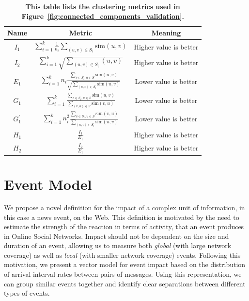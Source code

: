 \documentclass[10pt,letterpaper]{article}
\begin{document}
\begin{table}
  \centering
  \begin{tabular}{ c  c  c }
    \toprule
    Name & Metric & Meaning \\
    \midrule
    $I_1$ & $\sum_{i=1}^k \frac{1}{n_i} \sum_{(u,v) \in S_i} \text{sim}(u,v)$ & Higher value is better\\
    \midrule
    $I_2$ & $\sum_{i=1}^k \sqrt{ \sum_{(u,v) \in S_i} (u,v)}$ & Higher value is better \\
    \midrule
    $E_1$ & $\sum_{i=1}^{k} n_i \frac{\sum_{v \in S_i, u \in S} \text{sim}(u,v)}{\sqrt{\sum_{(u,v) \in S_i} \text{sim}(u,v)}}$ & Lower value is better \\
    \midrule
    $G_1$ & $\sum_{i=1}^k \frac{\sum_{v \in S_i, u \in S}\text{sim}(u,v)}{\sum_{(v,u) \in S}\text{sim}(v,u)}$ & Lower value is better \\
    \midrule
    $G_1^{'}$ & $\sum_{i=1}^k n_i^2 \frac{\sum_{v \in S_i, u \in S}\text{sim}(v,u)}{\sum_{(u,v) \in S_i}\text{sim}(u,v)}$ & Lower value is better \\
    \midrule
    $H_1$ & $\frac{I_1}{E_1}$ & Higher value is better \\
    \midrule
    $H_2$ & $\frac{I_2}{E_1}$ & Higher value is better \\
    \bottomrule
  \end{tabular}
  \caption{\textbf{This table lists the clustering metrics used in Figure~\ref{fig:connected_components_validation}.}}
  \label{table:clustering_metrics}
\end{table}


\section{Event Model}
We propose a novel definition for the impact of a complex unit of
information, in this case a news event, on the Web. This definition is
motivated by the need to estimate the strength of the reaction in
terms of activity, that an event produces in Online Social Networks.
Impact should not be dependent on the size and duration of an event,
allowing us to measure both {\em global} (with large network coverage)
as well as {\em local} (with smaller network coverage) events.
Following this motivation, we present a vector model for event impact
based on the distribution of arrival interval rates between pairs of
messages. Using this representation, we can group similar events
together and identify clear separations between different types of
events.
\end{document}
